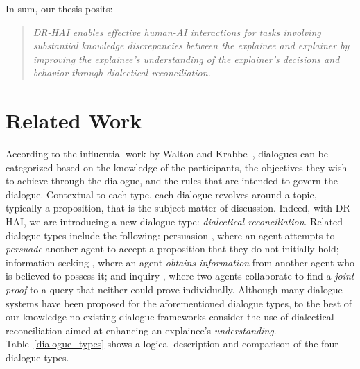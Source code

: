 \documentclass[letterpaper]{article} %
\begin{document}
In sum, our thesis posits:
\begin{quote}

\emph{DR-HAI enables effective human-AI interactions for tasks involving substantial knowledge discrepancies between the explainee and explainer by improving the explainee's understanding of the explainer's decisions and behavior through dialectical reconciliation.}
\end{quote}






\section{Related Work}

According to the influential work by Walton and Krabbe~\cite{walton1995commitment}, dialogues can be categorized based on the knowledge of the participants, the objectives they wish to achieve through the dialogue, and the rules that are intended to govern the dialogue. Contextual to each type, each dialogue revolves around a topic, typically a proposition, that is the subject matter of discussion. Indeed, with DR-HAI, we are introducing a new dialogue type: \emph{dialectical reconciliation}. Related dialogue types include the following: persuasion \cite{gordon1994,prakken2006formal}, where an agent attempts to \emph{persuade} another agent to accept a proposition that they do not initially hold; information-seeking \cite{parsons2003properties,fan2012agent}, where an agent \emph{obtains information} from another agent who is believed to possess it; and inquiry \cite{hitchcock2017some,black2009inquiry}, where two agents collaborate to find a \emph{joint proof} to a \mbox{query}
that neither could prove individually. Although many dialogue systems have been proposed for the aforementioned dialogue types, to the best of our knowledge %
no existing dialogue frameworks %
consider the use of dialectical reconciliation aimed at enhancing an explainee's \emph{understanding}. Table~\ref{dialogue_types} shows a logical description and comparison of the four dialogue types.
\end{document}
